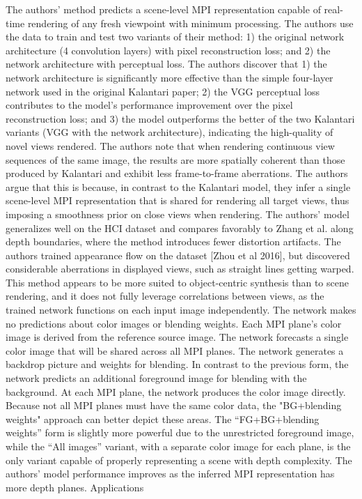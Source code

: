 The authors' method predicts a scene-level MPI representation capable of real-time rendering of any fresh viewpoint with minimum processing. The authors use the data to train and test two variants of their method: 1) the original network architecture (4 convolution layers) with pixel reconstruction loss; and 2) the network architecture with perceptual loss. The authors discover that 1) the network architecture is significantly more effective than the simple four-layer network used in the original Kalantari paper; 2) the VGG perceptual loss contributes to the model's performance improvement over the pixel reconstruction loss; and 3) the model outperforms the better of the two Kalantari variants (VGG with the network architecture), indicating the high-quality of novel views rendered. The authors note that when rendering continuous view sequences of the same image, the results are more spatially coherent than those produced by Kalantari and exhibit less frame-to-frame aberrations. The authors argue that this is because, in contrast to the Kalantari model, they infer a single scene-level MPI representation that is shared for rendering all target views, thus imposing a smoothness prior on close views when rendering. The authors' model generalizes well on the HCI dataset and compares favorably to Zhang et al. along depth boundaries, where the method introduces fewer distortion artifacts. The authors trained appearance flow on the dataset [Zhou et al 2016], but discovered considerable aberrations in displayed views, such as straight lines getting warped. This method appears to be more suited to object-centric synthesis than to scene rendering, and it does not fully leverage correlations between views, as the trained network functions on each input image independently. The network makes no predictions about color images or blending weights. Each MPI plane's color image is derived from the reference source image.
The network forecasts a single color image that will be shared across all MPI planes. The network generates a backdrop picture and weights for blending.
In contrast to the previous form, the network predicts an additional foreground image for blending with the background. At each MPI plane, the network produces the color image directly. Because not all MPI planes must have the same color data, the "BG+blending weights" approach can better depict these areas.
The “FG+BG+blending weights” form is slightly more powerful due to the unrestricted foreground image, while the “All images” variant, with a separate color image for each plane, is the only variant capable of properly representing a scene with depth complexity. The authors' model performance improves as the inferred MPI representation has more depth planes.
Applications

